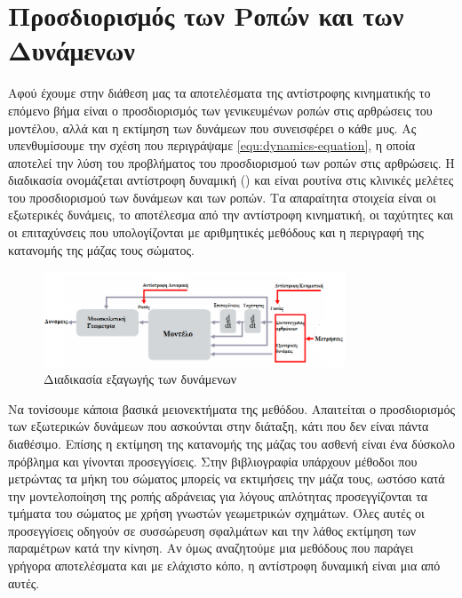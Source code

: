 \section{Προσδιορισμός των Ροπών και των Δυνάμενων}

Αφού έχουμε στην διάθεση μας τα αποτελέσματα της αντίστροφης κινηματικής το επόμενο βήμα είναι ο προσδιορισμός των γενικευμένων ροπών στις αρθρώσεις του μοντέλου, αλλά και η εκτίμηση των δυνάμεων που συνεισφέρει ο κάθε μυς. Ας υπενθυμίσουμε την σχέση που περιγράψαμε \ref{equ:dynamics-equation}, η οποία αποτελεί την λύση του προβλήματος του προσδιορισμού των ροπών στις αρθρώσεις. Η διαδικασία ονομάζεται αντίστροφη δυναμική () και είναι ρουτίνα στις κλινικές μελέτες του προσδιορισμού των δυνάμεων και των ροπών. Τα απαραίτητα στοιχεία είναι οι εξωτερικές δυνάμεις, το αποτέλεσμα από την αντίστροφη κινηματική, οι ταχύτητες και οι επιταχύνσεις που υπολογίζονται με αριθμητικές μεθόδους και η περιγραφή της κατανομής της μάζας τους σώματος.

\begin{figure}[H]
    \centering
    \includegraphics[width=0.8\textwidth, keepaspectratio]{fig/process.png}
    \caption{Διαδικασία εξαγωγής των δυνάμενων\protect\footnotemark}
    \label{fig:methods-process1}
\end{figure}

Να τονίσουμε κάποια βασικά μειονεκτήματα της μεθόδου. Απαιτείται ο προσδιορισμός των εξωτερικών δυνάμεων που ασκούνται στην διάταξη, κάτι που δεν είναι πάντα διαθέσιμο. Επίσης η εκτίμηση της κατανομής της μάζας του ασθενή είναι ένα δύσκολο πρόβλημα και γίνονται προσεγγίσεις. Στην βιβλιογραφία υπάρχουν μέθοδοι που μετρώντας τα μήκη του σώματος μπορείς να εκτιμήσεις την μάζα τους, ωστόσο κατά την μοντελοποίηση της ροπής αδράνειας για λόγους απλότητας προσεγγίζονται τα τμήματα του σώματος με χρήση γνωστών γεωμετρικών σχημάτων. Όλες αυτές οι προσεγγίσεις οδηγούν σε συσσώρευση σφαλμάτων και την λάθος εκτίμηση των παραμέτρων κατά την κίνηση. Αν όμως αναζητούμε μια μεθόδους που παράγει γρήγορα αποτελέσματα και με ελάχιστο κόπο, η αντίστροφη δυναμική είναι μια από αυτές.

